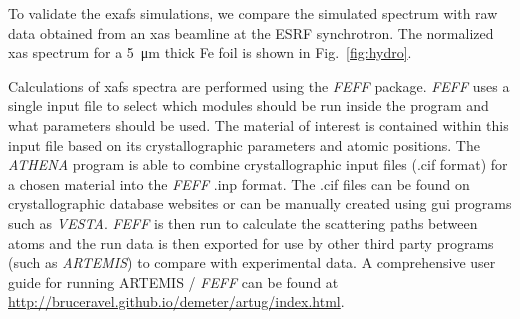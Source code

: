 To validate the \gls{exafs} simulations, we compare the simulated spectrum with raw
data obtained from an \gls{xas} beamline at the ESRF synchrotron. The
normalized \gls{xas} spectrum for a \SI{5}{\micro\metre} thick Fe foil is shown in
Fig.~\ref{fig:hydro}.
%
\begin{figure}
\end{figure}
%
Calculations of \gls{xafs} spectra are performed using the \textit{FEFF} package. \textit{FEFF} uses a
single input file to select which modules should be run inside the program and
what parameters should be used. The material of interest is contained within
this input file based on its crystallographic parameters and atomic positions.
The \textit{ATHENA} program is able to combine crystallographic input files (.cif format)
for a chosen material into the \textit{FEFF} .inp format. The .cif files can be
found on crystallographic database websites or can be manually created
using gui programs such as \textit{VESTA}. \textit{FEFF} is then run to
calculate the scattering paths
between atoms and the run data is then exported for use by other third party programs
(such as \textit{ARTEMIS}) to compare with experimental data.
A comprehensive user guide for running ARTEMIS
/ \textit{FEFF} can be found at\\
\href{http://bruceravel.github.io/demeter/artug/index.html}{http://bruceravel.github.io/demeter/artug/index.html}.
%
